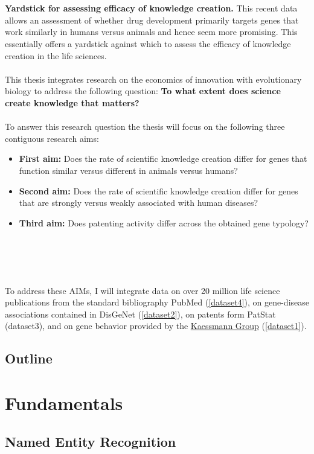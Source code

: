 \documentclass[11pt,titlepage,oneside,openany]{book}
\begin{document}
\\
\\
\textbf{Yardstick for assessing efficacy of knowledge creation.} This recent data allows an assessment of whether drug development primarily targets genes that work similarly in humans versus animals and hence seem more promising. This essentially offers a yardstick against which to assess the efficacy of knowledge creation in the life sciences.
\\
\\
This thesis integrates research on the economics of innovation with evolutionary biology to address the following question: \textbf{To what extent does science create knowledge that matters?}
\\
\\
To answer this research question the thesis will focus on the following three contiguous research aims:
\begin{itemize}
	\item \textbf{First aim:} Does the rate of scientific knowledge creation differ for genes that function similar versus different in animals versus humans?
	\item \textbf{Second aim:} Does the rate of scientific knowledge creation differ for genes that are strongly versus weakly associated with human diseases?
	\item \textbf{Third aim:} Does patenting activity differ across the obtained gene typology?
\end{itemize}
\\
\\
\\
\\
To address these AIMs, I will integrate data on over 20 million life science publications from the standard bibliography PubMed (\ref{dataset4}), on gene-disease associations contained in DisGeNet (\ref{dataset2}), on patents form PatStat (dataset3), and on gene behavior provided by the \href{https://www.zmbh.uni-heidelberg.de/kaessmann/}{Kaessmann Group} (\ref{dataset1}).

\section{Outline}

\chapter{Fundamentals}

\section{Named Entity Recognition}
\end{document}
